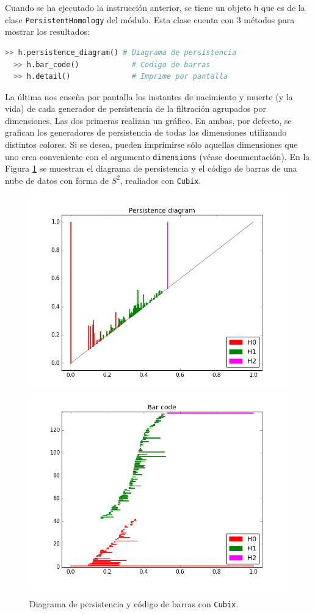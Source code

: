 \documentclass[12pt,a4paper,twoside]{article} %
\theoremstyle{plain}
\theoremstyle{definition}
\begin{document}
Cuando se ha ejecutado la instrucción anterior, se tiene un objeto \texttt{h} que es de la clase \texttt{PersistentHomology} del módulo. Esta clase cuenta con 3 métodos para mostrar los resultados:
\begin{lstlisting}[language=python]
  >> h.persistence_diagram() # Diagrama de persistencia
  >> h.bar_code()            # Codigo de barras
  >> h.detail()              # Imprime por pantalla
\end{lstlisting}
La última nos enseña por pantalla los instantes de nacimiento y muerte (y la vida) de cada generador de persistencia de la filtración agrupados por dimensiones. Las dos primeras realizan un gráfico. En ambas, por defecto, se grafican los generadores de persistencia de todas las dimensiones utilizando distintos colores. Si se desea, pueden imprimirse sólo aquellas dimensiones que uno crea conveniente con el argumento \texttt{dimensions} (véase documentación). En la Figura \ref{plots} se muestran el diagrama de persistencia y el código de barras de una nube de datos con forma de $S^2$, realiados con \texttt{Cubix}.

\begin{figure}[h!]
\centering
\includegraphics[scale=0.30]{img/s2diagram.png}
\includegraphics[scale=0.30]{img/s2barcode.png}
\caption{Diagrama de persistencia y código de barras con \texttt{Cubix}.}
\label{plots}
\end{figure}
\end{document}

